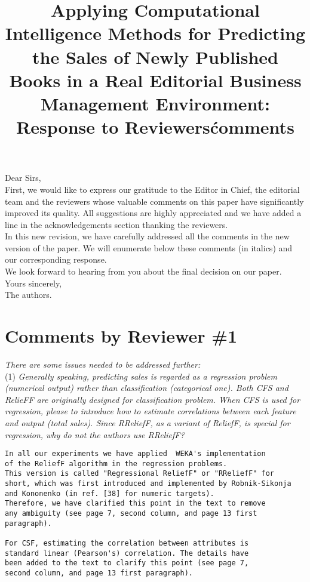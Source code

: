 \documentclass[preprint]{elsarticle}
\begin{document}

\title{Applying Computational Intelligence Methods for Predicting the Sales of Newly Published Books in a Real Editorial Business Management Environment: Response to Reviewers\' comments}

\noindent
Dear Sirs,\\

First, we would like to express our gratitude to the Editor in Chief,
the editorial team and the reviewers whose valuable comments on this
paper have significantly improved its quality. All suggestions are
highly appreciated and we have added a line in the acknowledgements
section thanking the reviewers. \\ 

In this new revision, we have carefully addressed all the comments in
the new version of the paper. We will enumerate below these comments
(in italics) and our corresponding response. \\ 

We look forward to hearing from you about the final decision on our paper. \\

\noindent
Yours sincerely,\\
The authors.


\section{Comments by Reviewer \#1}

\noindent \emph{There are some issues needed to be addressed further:} \\

\noindent (1) \emph{Generally speaking, predicting sales is regarded as a regression problem (numerical output) rather than classification (categorical one). Both CFS and RelieFF are originally designed for classification problem. When CFS is used for regression, please to introduce how to estimate correlations between each feature and output (total sales). Since RReliefF, as a variant of ReliefF, is special for regression, why do not the authors use RReliefF? } 

\begin{verbatim}
In all our experiments we have applied  WEKA's implementation 
of the ReliefF algorithm in the regression problems. 
This version is called "Regressional ReliefF" or "RReliefF" for 
short, which was first introduced and implemented by Robnik-Sikonja 
and Kononenko (in ref. [38] for numeric targets). 
Therefore, we have clarified this point in the text to remove 
any ambiguity (see page 7, second column, and page 13 first paragraph).

For CSF, estimating the correlation between attributes is 
standard linear (Pearson's) correlation. The details have 
been added to the text to clarify this point (see page 7, 
second column, and page 13 first paragraph).
\end{verbatim}
\end{document}
